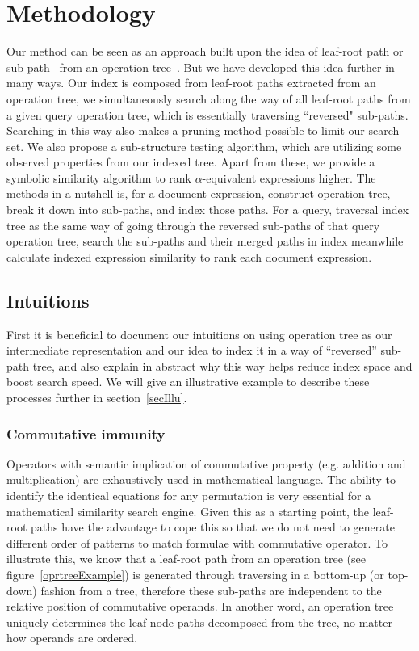\chapter{Methodology}
Our method can be seen as an approach built upon the idea of leaf-root path or sub-path~\cite{signifjap,MathMLleafroot,signfused,sefobyfo} from an operation tree~\cite{goodsurvey}. 
But we have developed this idea further in many ways. 
Our index is composed from leaf-root paths extracted from an operation tree, we simultaneously search along the way of all leaf-root paths from a given query operation tree, which is essentially traversing ``reversed" sub-paths.
Searching in this way also makes a pruning method possible to limit our search set. 
We also propose a sub-structure testing algorithm, which are utilizing some observed properties from our indexed tree. 
Apart from these, we provide a symbolic similarity algorithm to rank $\alpha$-equivalent expressions higher.
The methods in a nutshell is, for a document expression, construct operation tree, break it down into sub-paths, and index those paths. For a query, traversal index tree as the same way of going through the reversed sub-paths of that query operation tree, search the sub-paths and their merged paths in index meanwhile calculate indexed expression similarity to rank each document expression.

\section{Intuitions}
First it is beneficial to document our intuitions on using operation tree as our intermediate representation and our idea to index it in a way of “reversed” sub-path tree, and also explain in abstract why this way helps reduce index space and boost search speed.
We will give an illustrative example to describe these processes further in section~\ref{secIllu}.

\subsection{Commutative immunity}
Operators with semantic implication of commutative property (e.g. addition and multiplication) are exhaustively used in mathematical language. The ability to identify the identical equations for any permutation is very essential for a mathematical similarity search engine. 
Given this as a starting point, the leaf-root paths have the advantage to cope this so that we do not need to generate different order of patterns to match formulae with commutative operator. 
To illustrate this, we know that a leaf-root path from an operation tree (see figure~\ref{oprtreeExample}) is generated through traversing in a bottom-up (or top-down) fashion from a tree, therefore these sub-paths are independent to the relative position of commutative operands.
In another word, an operation tree uniquely determines the leaf-node paths decomposed from the tree, no matter how operands are ordered. 

